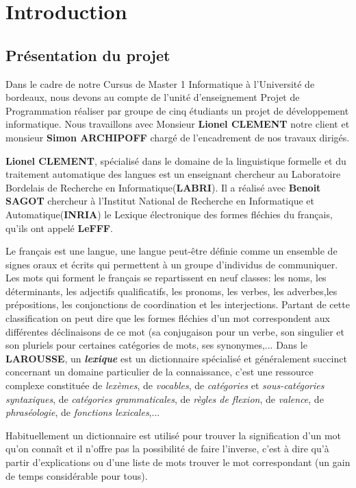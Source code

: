 
\newpage
\section{Introduction}
\subsection{Présentation du projet}
Dans le cadre de notre Cursus de Master 1 Informatique à l'Université de bordeaux, nous devons au compte de l'unité d'enseignement Projet de Programmation réaliser par groupe de cinq étudiants un projet de développement informatique. Nous travaillons avec Monsieur \textbf{Lionel CLEMENT} notre client et monsieur \textbf{Simon ARCHIPOFF} chargé de l'encadrement de nos travaux dirigés.


{\textbf{Lionel CLEMENT}, spécialisé dans le domaine de la linguistique formelle et du traitement automatique des langues est un enseignant chercheur au Laboratoire Bordelais de Recherche en Informatique(\textbf{LABRI}). Il a réalisé avec \textbf{Benoit SAGOT} chercheur à l'Institut National de Recherche en Informatique et Automatique(\textbf{INRIA})  le Lexique électronique des formes fléchies du français, qu'ils ont appelé \textbf{LeFFF}.\par}
{Le français est une langue, une langue peut-être définie comme un ensemble de signes oraux et écrits qui permettent à un groupe d'individus de communiquer. Les mots qui forment le français se repartissent en neuf classes: les noms, les déterminants, les adjectifs qualificatifs, les pronoms, les verbes, les adverbes,les prépositions, les conjonctions de coordination et les interjections. Partant de cette classification on peut dire que les formes fléchies d'un mot correspondent aux différentes déclinaisons de ce mot (sa conjugaison pour un verbe, son singulier et son pluriels pour certaines catégories de mots, ses synonymes,...
Dans le \textbf{LAROUSSE}, un \textit{\bf lexique} est un dictionnaire spécialisé et généralement succinct concernant un domaine particulier de la connaissance, c'est une ressource complexe constituée de \textit{lexèmes}, de \textit{vocables}, de \textit{catégories} et \textit{sous-catégories syntaxiques}, de \textit{catégories grammaticales}, de \textit{règles de flexion}, de \textit{valence}, de \textit{phraséologie}, de \textit{fonctions lexicales},...\par}

{Habituellement un dictionnaire est utilisé pour trouver la signification d'un mot qu'on connaît et il n'offre pas la possibilité de faire l'inverse, c'est à dire qu'à partir d'explications ou d'une liste de mots trouver le mot correspondant (un gain de temps considérable pour tous).\par}


